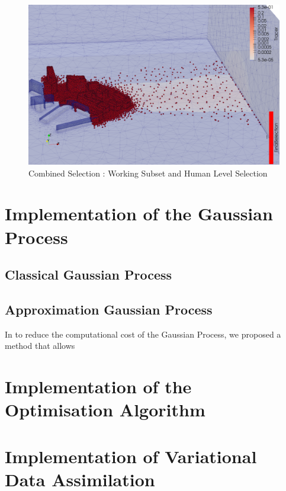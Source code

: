 \begin{figure}[h!]
\centering
	\includegraphics[width = 0.8 \linewidth]{figures/Subset/FinalSelection_zoom}
	\caption{Combined Selection : Working Subset and Human Level Selection}
	\label{fig:combined_selection}
\end{figure}
 


\section{Implementation of the Gaussian Process}


\subsection{Classical Gaussian Process}

\subsection{Approximation Gaussian Process}

In to reduce the computational cost of the Gaussian Process, we proposed a method that allows 

\section{Implementation of the Optimisation Algorithm}




\section{Implementation of Variational Data Assimilation}




